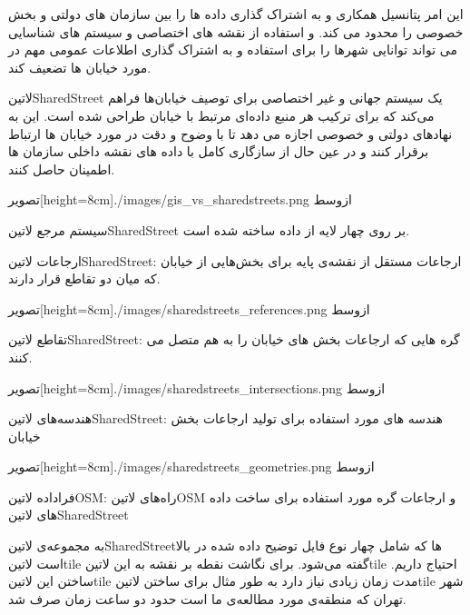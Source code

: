 این امر پتانسیل همکاری و به اشتراک گذاری داده ها را بین سازمان های دولتی و بخش خصوصی را محدود می کند. و استفاده از نقشه های اختصاصی و سیستم های شناسایی می تواند توانایی شهرها را برای استفاده و به اشتراک گذاری اطلاعات عمومی مهم در مورد خیابان ها تضعیف کند.

‌لاتین{SharedStreet} یک سیستم جهانی و غیر اختصاصی برای توصیف خیابان‌ها فراهم می‌کند که برای ترکیب هر منبع داده‌ای مرتبط با خیابان طراحی شده است. این به نهادهای دولتی و خصوصی اجازه می دهد تا با وضوح و دقت در مورد خیابان ها ارتباط برقرار کنند و در عین حال از سازگاری کامل با داده های نقشه داخلی سازمان ها اطمینان حاصل کنند.


  ‌تصویر[height=8cm]{./images/gis_vs_sharedstreets.png}
  ‌ازوسط

 سیستم مرجع ‌لاتین{SharedStreet} بر روی چهار لایه از داده ساخته شده است.


 ارجاعات ‌لاتین{SharedStreet}: ارجاعات مستقل از نقشه‌ی پایه برای بخش‌هایی از خیابان که میان دو تقاطع قرار دارند.


  ‌تصویر[height=8cm]{./images/sharedstreets_references.png}
  ‌ازوسط


 تقاطع ‌لاتین{SharedStreet}: گره هایی که ارجاعات بخش های خیابان را به هم متصل می کنند.


  ‌تصویر[height=8cm]{./images/sharedstreets_intersections.png}
  ‌ازوسط


 هندسه‌های ‌لاتین{SharedStreet}: هندسه های مورد استفاده برای تولید ارجاعات بخش خیابان

  ‌تصویر[height=8cm]{./images/sharedstreets_geometries.png}
  ‌ازوسط

 فراداده ‌لاتین{OSM}: راه‌های ‌لاتین{OSM} و ارجاعات گره مورد استفاده برای ساخت داده های ‌لاتین{SharedStreet}



به مجموعه‌ی ‌لاتین{SharedStreet}ها که شامل چهار نوع فایل توضیح داده شده در بالا است ‌لاتین{tile} گفته می‌شود. برای نگاشت نقطه بر نقشه به این ‌لاتین{tile} احتیاج داریم. ساختن این ‌لاتین{tile} مدت زمان زیادی نیاز دارد به طور مثال برای ساختن ‌لاتین{tile} شهر تهران که منطقه‌ی مورد مطالعه‌ی ما است حدود دو ساعت زمان صرف شد.

